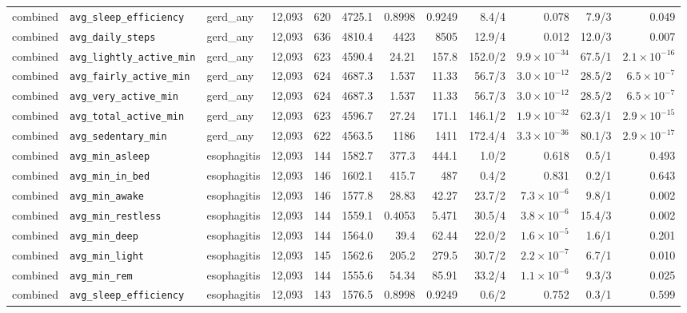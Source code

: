 \documentclass[11pt]{article}
\newcommand{\code}[1]{\texttt{\small #1}}
\begin{document}
\begin{longtable}{@{}p{1.4cm}p{2.9cm}p{1.7cm}rrrr rrrr r@{}}
combined & \code{avg\_sleep\_efficiency} & gerd\_any & 12{,}093 & 620 & 4725.1 & 0.8998 & 0.9249 & 8.4/4 & 0.078 & 7.9/3 & 0.049 \\
combined & \code{avg\_daily\_steps} & gerd\_any & 12{,}093 & 636 & 4810.4 &  4423 &  8505 & 12.9/4 & 0.012 & 12.0/3 & 0.007 \\
combined & \code{avg\_lightly\_active\_min} & gerd\_any & 12{,}093 & 623 & 4590.4 & 24.21 & 157.8 & 152.0/2 & $9.9\times10^{-34}$ & 67.5/1 & $2.1\times10^{-16}$ \\
combined & \code{avg\_fairly\_active\_min} & gerd\_any & 12{,}093 & 624 & 4687.3 & 1.537 & 11.33 & 56.7/3 & $3.0\times10^{-12}$ & 28.5/2 & $6.5\times10^{-7}$ \\
combined & \code{avg\_very\_active\_min} & gerd\_any & 12{,}093 & 624 & 4687.3 & 1.537 & 11.33 & 56.7/3 & $3.0\times10^{-12}$ & 28.5/2 & $6.5\times10^{-7}$ \\
combined & \code{avg\_total\_active\_min} & gerd\_any & 12{,}093 & 623 & 4596.7 & 27.24 & 171.1 & 146.1/2 & $1.9\times10^{-32}$ & 62.3/1 & $2.9\times10^{-15}$ \\
combined & \code{avg\_sedentary\_min} & gerd\_any & 12{,}093 & 622 & 4563.5 &  1186 &  1411 & 172.4/4 & $3.3\times10^{-36}$ & 80.1/3 & $2.9\times10^{-17}$ \\
combined & \code{avg\_min\_asleep} & esophagitis & 12{,}093 & 144 & 1582.7 & 377.3 & 444.1 & 1.0/2 & 0.618 & 0.5/1 & 0.493 \\
combined & \code{avg\_min\_in\_bed} & esophagitis & 12{,}093 & 146 & 1602.1 & 415.7 &   487 & 0.4/2 & 0.831 & 0.2/1 & 0.643 \\
combined & \code{avg\_min\_awake} & esophagitis & 12{,}093 & 146 & 1577.8 & 28.83 & 42.27 & 23.7/2 & $7.3\times10^{-6}$ & 9.8/1 & 0.002 \\
combined & \code{avg\_min\_restless} & esophagitis & 12{,}093 & 144 & 1559.1 & 0.4053 & 5.471 & 30.5/4 & $3.8\times10^{-6}$ & 15.4/3 & 0.002 \\
combined & \code{avg\_min\_deep} & esophagitis & 12{,}093 & 144 & 1564.0 &  39.4 & 62.44 & 22.0/2 & $1.6\times10^{-5}$ & 1.6/1 & 0.201 \\
combined & \code{avg\_min\_light} & esophagitis & 12{,}093 & 145 & 1562.6 & 205.2 & 279.5 & 30.7/2 & $2.2\times10^{-7}$ & 6.7/1 & 0.010 \\
combined & \code{avg\_min\_rem} & esophagitis & 12{,}093 & 144 & 1555.6 & 54.34 & 85.91 & 33.2/4 & $1.1\times10^{-6}$ & 9.3/3 & 0.025 \\
combined & \code{avg\_sleep\_efficiency} & esophagitis & 12{,}093 & 143 & 1576.5 & 0.8998 & 0.9249 & 0.6/2 & 0.752 & 0.3/1 & 0.599 \\

\end{longtable}
\end{document}
